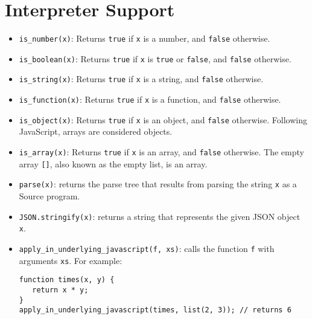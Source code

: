 \section*{Interpreter Support}

\begin{itemize}
\item \lstinline{is_number(x)}: Returns \lstinline{true} if \lstinline{x} is a number, and 
\lstinline{false} otherwise.
\item \lstinline{is_boolean(x)}: Returns \lstinline{true} if \lstinline{x} is \lstinline{true} or \lstinline{false}, and \lstinline{false} otherwise.
\item \lstinline{is_string(x)}: Returns \lstinline{true} if \lstinline{x} is a
string, and \lstinline{false} otherwise.
\item \lstinline{is_function(x)}: Returns \lstinline{true} if \lstinline{x} is a
function, and \lstinline{false} otherwise.
\item \lstinline{is_object(x)}: Returns \lstinline{true} if \lstinline{x} is an
object, and \lstinline{false} otherwise. Following JavaScript, arrays are considered
objects.
\item \lstinline{is_array(x)}: Returns \lstinline{true} if \lstinline{x} is an
array, and \lstinline{false} otherwise. The empty array \lstinline{[]}, also known
as the empty list, is an array.
\item \lstinline{parse(x)}: returns the parse tree that results from parsing
the string \lstinline{x} as a Source program.
\item \lstinline{JSON.stringify(x)}: returns a string that represents the given JSON object
\lstinline{x}.
\item \lstinline{apply_in_underlying_javascript(f, xs)}: calls the function \lstinline{f}
with arguments \lstinline{xs}. For example:
\begin{lstlisting}
function times(x, y) {
   return x * y;
}
apply_in_underlying_javascript(times, list(2, 3)); // returns 6
\end{lstlisting}
\end{itemize}
